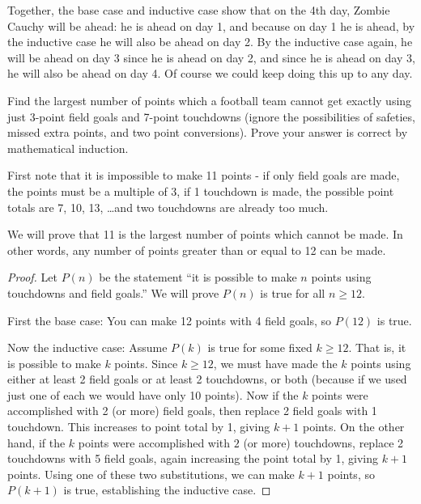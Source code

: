 \begin{questions}
\begin{solution}
    Together, the base case and inductive case show that on the 4th day, Zombie Cauchy will be ahead: he is ahead on day 1, and because on day 1 he is ahead, by the inductive case he will also be ahead on day 2.  By the inductive case again, he will be ahead on day 3 since he is ahead on day 2, and since he is ahead on day 3, he will also be ahead on day 4.  Of course we could keep doing this up to any day.
\end{solution}


\question Find the largest number of points which a football team cannot get exactly using just 3-point field goals and 7-point touchdowns (ignore the possibilities of safeties, missed extra points, and two point conversions).  Prove your answer is correct by mathematical induction.

\begin{solution}
  First note that it is impossible to make 11 points - if only field goals are made, the points must be a multiple of 3, if 1 touchdown is made, the possible point totals are 7, 10, 13, \ldots and two touchdowns are already too much.
  
  We will prove that 11 is the largest number of points which cannot be made.  In other words, any number of points greater than or equal to 12 can be made.
  
  \begin{proof}
    Let $P(n)$ be the statement ``it is possible to make $n$ points using touchdowns and field goals.''  We will prove $P(n)$ is true for all $n \ge 12$.
    
    First the base case: You can make 12 points with 4 field goals, so $P(12)$ is true.
    
    Now the inductive case: Assume $P(k)$ is true for some fixed $k \ge 12$.  That is, it is possible to make $k$ points.  Since $k \ge 12$, we must have made the $k$ points using either at least 2 field goals or at least 2 touchdowns, or both (because if we used just one of each we would have only 10 points).  Now if the $k$ points were accomplished with 2 (or more) field goals, then replace 2 field goals with 1 touchdown.  This increases to point total by 1, giving $k + 1$ points.  On the other hand, if the $k$ points were accomplished with $2$ (or more) touchdowns, replace 2 touchdowns with 5 field goals, again increasing the point total by 1, giving $k+1$ points.  Using one of these two substitutions, we can make $k+1$ points, so $P(k+1)$ is true, establishing the inductive case.
    

\end{proof}
\end{solution}
\end{questions}
